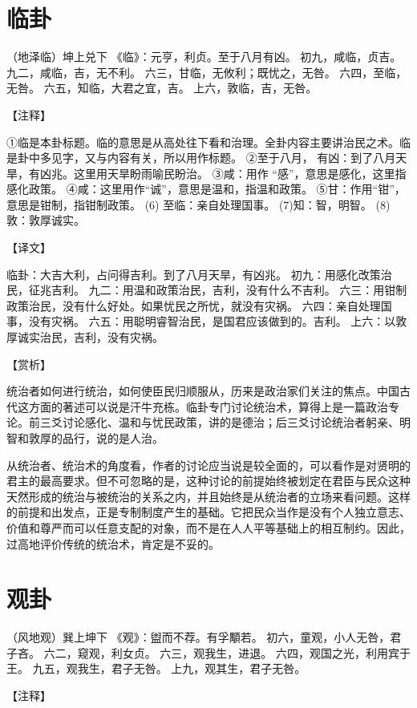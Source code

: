 \documentclass[a4paper,12pt,UTF8,twoside]{ctexbook}
\begin{document}
\chapter{临卦}

（地泽临）坤上兑下
《临》：元亨，利贞。至于八月有凶。
初九，咸临，贞吉。
九二，咸临，吉，无不利。
六三，甘临，无攸利；既忧之，无咎。
六四，至临，无咎。
六五，知临，大君之宜，吉。
上六，敦临，吉，无咎。

【注释】

①临是本卦标题。临的意思是从高处往下看和治理。全卦内容主要讲治民之术。临是卦中多见字，又与内容有关，所以用作标题。
②至于八月， 有凶：到了八月天旱，有凶兆。这里用天旱盼雨喻民盼治。
③咸：用作 “感”，意思是感化，这里指感化政策。
④咸：这里用作“诚”，意思是温和，指温和政策。
⑤甘：作用“钳”，意思是钳制，指钳制政策。
(6) 至临：亲自处理国事。
(7)知：智，明智。
(8)敦：敦厚诚实。

【译文】

临卦：大吉大利，占问得吉利。到了八月天旱，有凶兆。
初九：用感化改策治民，征兆吉利。
九二：用温和政策治民，吉利，没有什么不吉利。
六三：用钳制政策治民，没有什么好处。如果忧民之所忧，就没有灾祸。
六四：亲自处理国事，没有灾祸。
六五：用聪明睿智治民，是国君应该做到的。吉利。
上六：以敦厚诚实治民，吉利，没有灾祸。

【赏析】

统治者如何进行统治，如何使臣民归顺服从，历来是政治家们关注的焦点。中国古代这方面的著述可以说是汗牛充栋。临卦专门讨论统治术，算得上是一篇政治专论。前三爻讨论感化、温和与忧民政策，讲的是德治；后三爻讨论统治者躬亲、明智和敦厚的品行，说的是人治。

从统治者、统治术的角度看，作者的讨论应当说是较全面的，可以看作是对贤明的君主的最高要求。但不可忽略的是，这种讨论的前提始终被划定在君臣与民众这种天然形成的统治与被统治的关系之内，并且始终是从统治者的立场来看问题。这样的前提和出发点，正是专制制度产生的基础。它把民众当作是没有个人独立意志、价值和尊严而可以任意支配的对象，而不是在人人平等基础上的相互制约。因此，过高地评价传统的统治术，肯定是不妥的。

\chapter{观卦}

（风地观）巽上坤下
《观》：盥而不荐。有孚顒若。
初六，童观，小人无咎，君子吝。
六二，窥观，利女贞。
六三，观我生，进退。
六四，观国之光，利用宾于王。
九五，观我生，君子无咎。
上九，观其生，君子无咎。

【注释】
\end{document}
